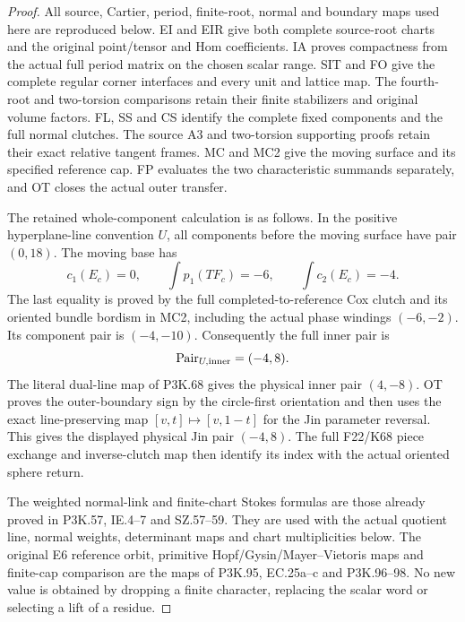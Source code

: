 \begin{proof}
All source, Cartier, period, finite-root, normal and boundary
maps used here are reproduced below. EI and EIR give both complete
source-root charts and the original point/tensor and Hom
coefficients. IA proves compactness from the actual full period
matrix on the chosen scalar range. SIT and FO give the complete
regular corner interfaces and every unit and lattice map. The
fourth-root and two-torsion comparisons retain their finite
stabilizers and original volume factors. FL, SS and CS identify
the complete fixed components and the full normal clutches. The
source A3 and two-torsion supporting proofs retain their exact
relative tangent frames. MC and MC2 give the moving surface and
its specified reference cap. FP evaluates the two characteristic
summands separately, and OT closes the actual outer transfer.

The retained whole-component calculation is as follows. In the
positive hyperplane-line convention \(U\), all components before
the moving surface have pair \((0,18)\). The moving base has
\[
 c_1(E_c)=0,\qquad
 \int p_1(TF_c)=-6,\qquad
 \int c_2(E_c)=-4.
\]
The last equality is proved by the full completed-to-reference
Cox clutch and its oriented bundle bordism in MC2, including the
actual phase windings \((-6,-2)\). Its component pair is
\((-4,-10)\). Consequently the full inner pair is
\[
       \operatorname{Pair}_{U,\rm inner}=(-4,8).
\]
The literal dual-line map of P3K.68 gives the physical inner pair
\((4,-8)\). OT proves the outer-boundary sign by the circle-first
orientation and then uses the exact line-preserving map
\([v,t]\mapsto[v,1-t]\) for the Jin parameter reversal. This gives
the displayed physical Jin pair \((-4,8)\). The full F22/K68
piece exchange and inverse-clutch map then identify its index
with the actual oriented sphere return.

The weighted normal-link and finite-chart Stokes formulas are
those already proved in P3K.57, IE.4--7 and SZ.57--59. They are
used with the actual quotient line, normal weights, determinant
maps and chart multiplicities below. The original E6 reference
orbit, primitive Hopf/Gysin/Mayer--Vietoris maps and finite-cap
comparison are the maps of P3K.95, EC.25a--c and P3K.96--98.
No new value is obtained by dropping a finite character, replacing
the scalar word or selecting a lift of a residue.


\end{proof}
